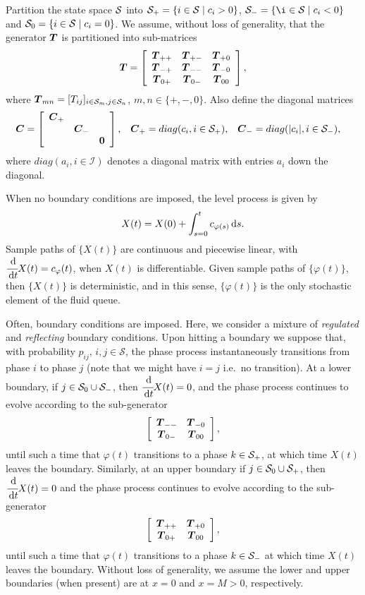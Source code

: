 Partition the state space \(\mathcal{S}\) into \(\mathcal{S}_+ = \{i\in\mathcal{S}\mid c_i>0\}\), \(\calS_- = \{\i\in\calS\mid c_i<0\}\) and \(\mathcal{S}_0 = \{i\in\mathcal{S}\mid c_i=0\}\). We assume, without loss of generality, that the generator \(\boldsymbol T\) is partitioned into sub-matrices 
\[\boldsymbol T = \left[\begin{array}{ccc}\boldsymbol T_{++} & \boldsymbol T_{+-} & \boldsymbol T_{+0} \\ \boldsymbol T_{-+} & \boldsymbol T_{--} & \boldsymbol T_{-0} \\ \boldsymbol T_{0+} & \boldsymbol T_{0-} & \boldsymbol T_{00}  \end{array}\right],\]
where \(\boldsymbol T_{mn} = [T_{ij}]_{i\in\mathcal S_m, j\in\mathcal S_n}\), \(m,n\in\{+,-,0\}\). Also define the diagonal matrices 
\begin{align*}
	\boldsymbol C &= \left[\begin{array}{ccc} \boldsymbol C_+ && \\ &\boldsymbol C_-& \\ && \boldsymbol 0\end{array}\right], && \boldsymbol C_+ = diag(c_i,i\in\mathcal{S}_+), && \boldsymbol C_- = diag(|c_i|,i\in\mathcal{S}_-),
\end{align*}
where \(diag(a_i,i\in\mathcal I)\) denotes a diagonal matrix with entries \(a_i\) down the diagonal. 

When no boundary conditions are imposed, the level process is given by 
\[X(t) = X(0) + \int_{s=0}^t c_{\varphi(s)}\, \mathrm{d} s.\]
Sample paths of \(\{X(t)\}\) are continuous and piecewise linear, with \(\cfrac{\, \mathrm{d} }{\, \mathrm{d} t} X(t) = c_\varphi(t)\), when \(X(t)\) is differentiable. Given sample paths of \(\{\varphi(t)\}\), then \(\{X(t)\}\) is deterministic, and in this sense, \(\{\varphi(t)\}\) is the only stochastic element of the fluid queue. 

Often, boundary conditions are imposed. Here, we consider a mixture of \emph{regulated} and \emph{reflecting} boundary conditions. Upon hitting a boundary we suppose that, with probability \(p_{ij},\,i,j\in\mathcal S\), the phase process instantaneously transitions from phase \(i\) to phase \(j\) (note that we might have \(i=j\) i.e.~no transition). At a lower boundary, if \(j\in\mathcal{S}_0\cup\mathcal{S}_-\), then \(\cfrac{\, \mathrm{d}}{\, \mathrm{d} t} X(t) = 0\), and the phase process continues to evolve according to the sub-generator 
\[\left[\begin{array}{cc} \boldsymbol T_{--} & \boldsymbol T_{-0} \\ \boldsymbol T_{0-} & \boldsymbol T_{00}  \end{array}\right],\]
until such a time that \(\varphi(t)\) transitions to a phase \(k\in\mathcal{S}_+\), at which time \(X(t)\) leaves the boundary. Similarly, at an upper boundary if \(j\in\mathcal{S}_0\cup\mathcal{S}_+\), then \(\cfrac{\, \mathrm{d}}{\, \mathrm{d} t} X(t) = 0\) and the phase process continues to evolve according to the sub-generator 
\[\left[\begin{array}{cc} \boldsymbol T_{++} & \boldsymbol T_{+0} \\ \boldsymbol T_{0+} & \boldsymbol T_{00}  \end{array}\right],\]
until such a time that \(\varphi(t)\) transitions to a phase \(k\in\mathcal{S}_-\) at which time \(X(t)\) leaves the boundary. Without loss of generality, we assume the lower and upper boundaries (when present) are at \(x=0\) and \(x=M>0\), respectively.

